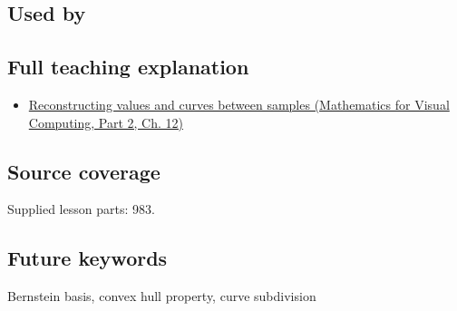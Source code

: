 \subsection{Used by}\label{appendix-ddbec701898c-used-by}

\hypertarget{appendix-ddbec701898c-used-by}{}

\subsection{Full teaching explanation}\label{appendix-ddbec701898c-full-teaching-explanation}

\hypertarget{appendix-ddbec701898c-full-teaching-explanation}{}

\begin{itemize}
\tightlist
\item
  \href{../02-Mathematics-for-Visual-Computing-P02/main.pdf\#02-foundations-ii-ch028-reconstructing-values-and-curves-between-samples}{Reconstructing values and curves between samples (Mathematics for Visual Computing, Part 2, Ch. 12)}
\end{itemize}

\subsection{Source coverage}\label{appendix-ddbec701898c-source-coverage}

\hypertarget{appendix-ddbec701898c-source-coverage}{}

Supplied lesson parts: 983.

\subsection{Future keywords}\label{appendix-ddbec701898c-future-keywords}

\hypertarget{appendix-ddbec701898c-future-keywords}{}

Bernstein basis, convex hull property, curve subdivision
